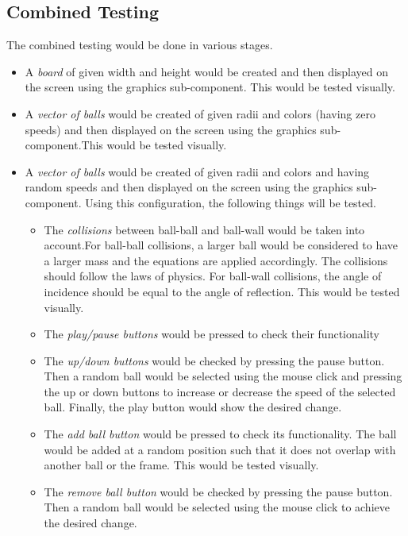 \documentclass{article}
\begin{document}
\subsection{Combined Testing}
The combined testing would be done in various stages.
\begin{itemize}
\item A \textit{board} of given width and height would be created and then displayed on the screen using the graphics sub-component. This would be tested visually.
\item A \textit{vector of balls} would be created of given radii and colors (having zero speeds) and then displayed on the screen using the graphics sub-component.This would be tested visually.
\item A \textit{vector of balls} would be created of given radii and colors and having random speeds and then displayed on the screen using the graphics sub-component. Using this configuration, the following things will be tested.
\begin{itemize}
\item The \textit{collisions} between ball-ball and ball-wall would be taken into account.For ball-ball collisions, a larger ball would be considered to have a larger mass and the equations are applied accordingly. The collisions should follow the laws of physics. For ball-wall collisions, the angle of incidence should be equal to the angle of reflection. This would be tested visually.
\item The \textit{play/pause buttons} would be pressed to check their functionality
\item The \textit{up/down buttons} would be checked by pressing the pause button. Then a random ball would be selected using the mouse click and pressing the up or down buttons to increase or decrease the speed of the selected ball. Finally, the play button would show the desired change.
\item The \textit{add ball button} would be pressed to check its functionality. The ball would be added at a random position such that it does not overlap with another ball or the frame. This would be tested visually.
\item The \textit{remove ball button} would be checked by pressing the pause button. Then a random ball would be selected using the mouse click to achieve the desired change.
\end{itemize}
\end{itemize}
\end{document}
